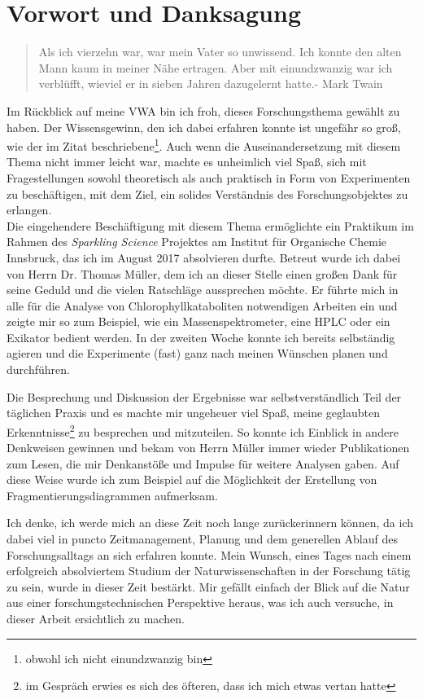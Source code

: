 \chapter*{Vorwort und Danksagung}
\label{cha:Vorwort}

\begin{quotation}
\glqq Als ich vierzehn war, war mein Vater so unwissend. Ich konnte den alten Mann kaum in meiner Nähe ertragen. Aber mit einundzwanzig war ich verblüfft, wieviel er in sieben Jahren dazugelernt hatte.\grqq - Mark Twain
\end{quotation}

Im Rückblick auf meine VWA bin ich froh, dieses Forschungsthema gewählt zu haben. Der Wissensgewinn, den ich dabei erfahren konnte ist ungefähr so groß, wie der im Zitat beschriebene\footnote{obwohl ich nicht einundzwanzig bin}. Auch wenn die Auseinandersetzung mit diesem Thema nicht immer leicht war, machte es unheimlich viel Spaß, sich mit Fragestellungen sowohl theoretisch als auch praktisch in Form von Experimenten zu beschäftigen, mit dem Ziel, ein solides Verständnis des Forschungsobjektes zu erlangen.\\

Die eingehendere Beschäftigung mit diesem Thema ermöglichte ein Praktikum im Rahmen des \textit{Sparkling Science} Projektes am Institut für Organische Chemie Innsbruck, das ich im August 2017 absolvieren durfte. Betreut wurde ich dabei von Herrn Dr. Thomas Müller, dem ich an dieser Stelle einen großen Dank für seine Geduld und die vielen Ratschläge aussprechen möchte. Er führte mich in alle für die Analyse von Chlorophyllkataboliten notwendigen Arbeiten ein und zeigte mir so zum Beispiel, wie ein Massenspektrometer, eine HPLC oder ein Exikator bedient werden. In der zweiten Woche konnte ich bereits selbständig agieren und die Experimente (fast) ganz nach meinen Wünschen planen und durchführen. 

Die Besprechung und Diskussion der Ergebnisse war selbstverständlich Teil der täglichen Praxis und es machte mir ungeheuer viel Spaß, meine geglaubten Erkenntnisse\footnote{im Gespräch erwies es sich des öfteren, dass ich mich etwas vertan hatte} zu besprechen und mitzuteilen. So konnte ich Einblick in andere Denkweisen gewinnen und bekam von Herrn Müller immer wieder Publikationen zum Lesen, die mir Denkanstöße und Impulse für weitere Analysen gaben. Auf diese Weise wurde ich zum Beispiel auf die Möglichkeit der Erstellung von Fragmentierungsdiagrammen aufmerksam. 

Ich denke, ich werde mich an diese Zeit noch lange zurückerinnern können, da ich dabei viel in puncto Zeitmanagement, Planung und dem generellen Ablauf des Forschungsalltags an sich erfahren konnte. Mein Wunsch, eines Tages nach einem erfolgreich absolviertem Studium der Naturwissenschaften in der Forschung tätig zu sein, wurde in dieser Zeit bestärkt. Mir gefällt einfach der Blick auf die Natur aus einer forschungstechnischen Perspektive heraus, was ich auch versuche, in dieser Arbeit ersichtlich zu machen.\\

